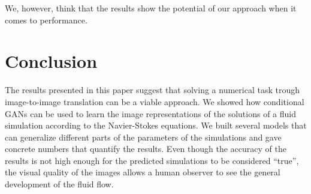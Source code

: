 \documentclass{llncs}
\begin{document}
We, however, think that the results show the potential of our approach when it comes to performance.

\section{Conclusion}\label{conclusion}
The results presented in this paper suggest that solving a numerical task trough image-to-image translation can be a viable approach. We showed how conditional GANs can be used to learn the image representations of the solutions of a fluid simulation according to the Navier-Stokes equations. We built several models that can generalize different parts of the parameters of the simulations and gave concrete numbers that quantify the results. Even though the accuracy of the results is not high enough for the predicted simulations to be considered ``true'', the visual quality of the images allows a human observer to see the general development of the fluid flow.
\end{document}
